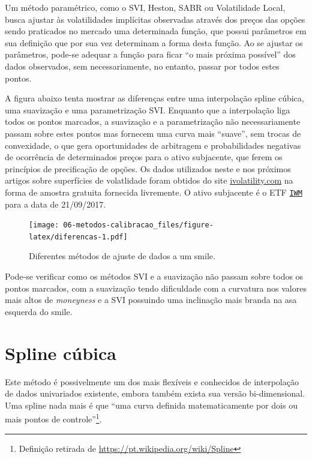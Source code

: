 \documentclass[]{book}
\let\rmarkdownfootnote\footnote%
\def\footnote{\protect\rmarkdownfootnote}
\theoremstyle{definition}
\theoremstyle{definition}
\theoremstyle{definition}
\theoremstyle{remark}
\begin{document}
Um método paramétrico, como o SVI, Heston, SABR ou Volatilidade Local, busca ajustar às volatilidades implícitas observadas através dos preços das opções sendo praticados no mercado uma determinada função, que possui parâmetros em sua definição que por sua vez determinam a forma desta função. Ao se ajustar os parâmetros, pode-se adequar a função para ficar ``o mais próxima possível'' dos dados observados, sem necessariamente, no entanto, passar por todos estes pontos.

A figura abaixo tenta mostrar as diferenças entre uma interpolação spline cúbica, uma suavização e uma parametrização SVI. Enquanto que a interpolação liga todos os pontos marcados, a suavização e a parametrização não necessariamente passam sobre estes pontos mas fornecem uma curva mais ``suave'', sem trocas de convexidade, o que gera oportunidades de arbitragem e probabilidades negativas de ocorrência de determinados preços para o ativo subjacente, que ferem os princípios de precificação de opções. Os dados utilizados neste e nos próximos artigos sobre superfícies de volatlidade foram obtidos do site \href{http://www.ivolatility.com/doc/usa/IV_Raw_Delta_surface.csv}{ivolatility.com} na forma de amostra gratuita fornecida livremente. O ativo subjacente é o ETF \href{https://www.ishares.com/us/products/239710/ishares-russell-2000-etf}{\texttt{IWM}} para a data de 21/09/2017.

\begin{figure}
\centering
\texttt{[image: 06-metodos-calibracao\_files/figure-latex/diferencas-1.pdf]}
\caption{\label{fig:diferencas}Diferentes métodos de ajuste de dados a um smile.}
\end{figure}

Pode-se verificar como os métodos SVI e a suavização não passam sobre todos os pontos marcados, com a suavização tendo dificuldade com a curvatura nos valores mais altos de \emph{moneyness} e a SVI possuindo uma inclinação mais branda na asa esquerda do smile.

\hypertarget{spline-cubica}{%
\section{Spline cúbica}\label{spline-cubica}}

Este método é possivelmente um dos mais flexíveis e conhecidos de interpolação de dados univariados existente, embora também exista sua versão bi-dimensional. Uma spline nada mais é que ``uma curva definida matematicamente por dois ou mais pontos de controle''\footnote{Definição retirada de \url{https://pt.wikipedia.org/wiki/Spline}}.
\end{document}
